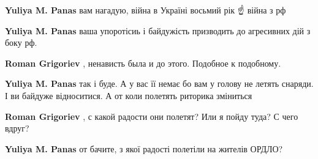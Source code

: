 \begin{itemize}
\begin{itemize}
\begin{itemize}
\textbf{Yuliya M. Panas} вам нагадую, війна в Україні восьмий рік ☝️ війна з рф

 
\textbf{Yuliya M. Panas} ваша упоротісиь і байдужість призводить до агресивних дій з боку рф.

 
\textbf{Roman Grigoriev} , ненависть была и до этого. Подобное к подобному.

 
\textbf{Yuliya M. Panas} так і буде. А у вас її немає бо вам у голову не летять
снаряди. І ви байдуже відноситися. А от коли полетять риторика зміниться 🤷

 
\textbf{Roman Grigoriev} , с какой радости они полетят? Или я пойду туда? С чего вдруг?

 
\textbf{Yuliya M. Panas} от бачите, з якої радості полетіли на жителів ОРДЛО?

 

\end{itemize}
\end{itemize}
\end{itemize}
